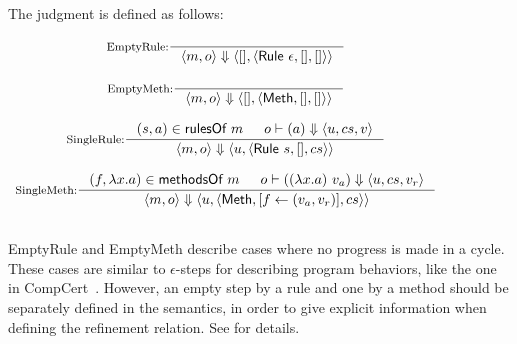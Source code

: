 \begin{definition}
  \label{def-semsstep}
  The judgment  is defined as follows:
  \begin{center}
    \begin{math}
      \begin{array}{c}
        \inference[EmptyRule:]{}
                  {\semsstep{m}{o}{\emptymap}
                    {\alpharule{\epsilon}}{\emptymap}{\emptymap}} \\
        \mbox{} \\
        \inference[EmptyMeth:]{}
                  {\semsstep{m}{o}{\emptymap}
                    {\alphameth}{\emptymap}{\emptymap}} \\
        \mbox{} \\
        \inference[SingleRule:]{\rulepair{s}{a} \in \rulesofm{m} & \semact{o}{a}{u}{cs}{v}}
                  {\semsstep{m}{o}{u}{\alpharule{s}}{\emptymap}{cs}} \\
        \mbox{} \\
        \inference[SingleMeth:]{\methodpair{f}{\lambda x.a} \in \methsofm{m} &
          \semact{o}{(\lambda x.a)\ v_a}{u}{cs}{v_r}}
                  {\semsstep{m}{o}{u}{\alphameth{}}{\lblupd{}{f}{(v_a, v_r)}}{cs}} \\
        \mbox{} \\
      \end{array}
    \end{math}
  \end{center}
\end{definition}

EmptyRule and EmptyMeth describe cases where no progress is made in a
cycle. These cases are similar to $\epsilon$-steps for describing
program behaviors, like the one in \todo{} CompCert~\cite{}. However,
an empty step by a rule and one by a method should be separately
defined in the \Substep{} semantics, in order to give explicit
information when defining the refinement relation. See \todo{}
 for details.

